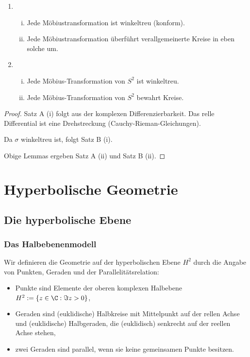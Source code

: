 \begin{st}
	\begin{enumerate}[A:]
		\item
			\begin{enumerate}[(i)]
				\item
					Jede Möbiustransformation ist winkeltreu (konform).
				\item
					Jede Möbiustransformation überführt verallgemeinerte Kreise in eben solche um.
			\end{enumerate}
		\item
			\begin{enumerate}[(i)]
				\item
					Jede Möbius-Transformation von $S^2$ ist winkeltreu.
				\item
					Jede Möbius-Transformation von $S^2$ bewahrt Kreise.
			\end{enumerate}
	\end{enumerate}
	\begin{proof}
		Satz A (i) folgt aus der komplexen Differenzierbarkeit.
		Das relle Differential ist eine Drehstreckung (Cauchy-Rieman-Gleichungen).

		Da $\sigma$ winkeltreu ist, folgt Satz B (i).

		Obige Lemmas ergeben Satz A (ii) und Satz B (ii).
	\end{proof}
\end{st}


\section{Hyperbolische Geometrie}


\subsection{Die hyperbolische Ebene}

\subsubsection{Das Halbebenenmodell}

Wir definieren die Geometrie auf der hyperbolischen Ebene $H^2$ durch die Angabe von Punkten, Geraden und der Parallelitätsrelation:
\begin{itemize}
	\item
		Punkte sind Elemente der oberen komplexen Halbebene $H^2 := \{ z \in \C : \Im z > 0 \}$,
	\item
		Geraden sind (euklidische) Halbkreise mit Mittelpunkt auf der rellen Achse und (euklidische) Halbgeraden, die (euklidisch) senkrecht auf der reellen Achse stehen,
	\item
		zwei Geraden sind parallel, wenn sie keine gemeinsamen Punkte besitzen.
\end{itemize}

